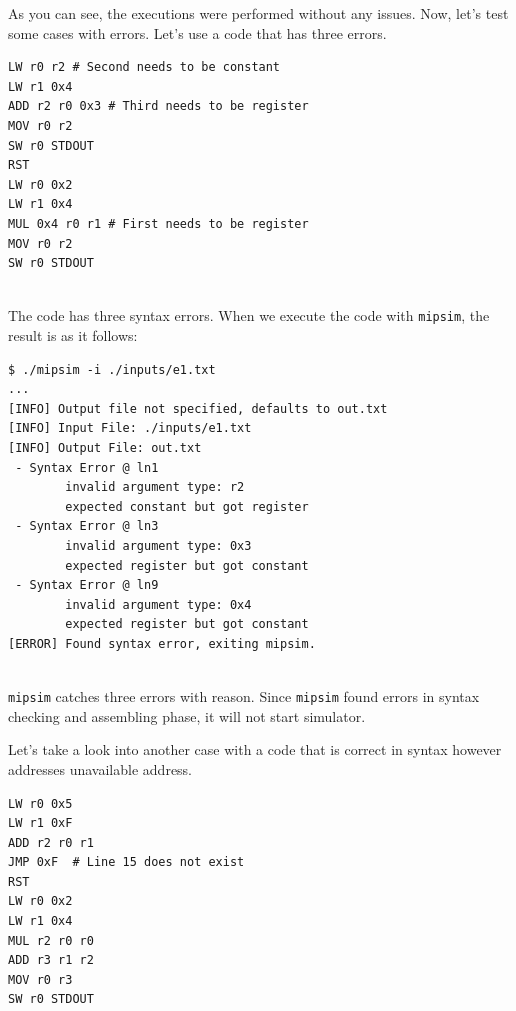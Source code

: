 \documentclass{homework}
\begin{document}
As you can see, the executions were performed without any issues. Now, let's test some cases with errors. Let's use a code that has three errors.
\\
\begin{center}
\begin{code}
\begin{verbatim}
LW r0 r2 # Second needs to be constant
LW r1 0x4
ADD r2 r0 0x3 # Third needs to be register
MOV r0 r2
SW r0 STDOUT
RST
LW r0 0x2
LW r1 0x4
MUL 0x4 r0 r1 # First needs to be register
MOV r0 r2
SW r0 STDOUT
\end{verbatim}
\end{code}
\end{center}
\\
The code has three syntax errors. When we execute the code with \texttt{mipsim}, the result is as it follows:
\\
\begin{center}
\begin{code}
\begin{verbatim}
$ ./mipsim -i ./inputs/e1.txt
...
[INFO] Output file not specified, defaults to out.txt
[INFO] Input File: ./inputs/e1.txt
[INFO] Output File: out.txt
 - Syntax Error @ ln1
        invalid argument type: r2
        expected constant but got register
 - Syntax Error @ ln3
        invalid argument type: 0x3
        expected register but got constant
 - Syntax Error @ ln9
        invalid argument type: 0x4
        expected register but got constant
[ERROR] Found syntax error, exiting mipsim.
\end{verbatim}
\end{code}
\end{center}
\\
\texttt{mipsim} catches three errors with reason. Since \texttt{mipsim} found errors in syntax checking and assembling phase, it will not start simulator. 
\par
Let's take a look into another case with a code that is correct in syntax however addresses unavailable address.
\\
\begin{center}
\begin{code}
\begin{verbatim}
LW r0 0x5
LW r1 0xF
ADD r2 r0 r1
JMP 0xF  # Line 15 does not exist
RST
LW r0 0x2
LW r1 0x4
MUL r2 r0 r0
ADD r3 r1 r2
MOV r0 r3
SW r0 STDOUT
\end{verbatim}
\end{code}
\end{center}
\end{document}
